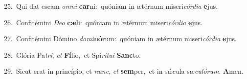 {\numbfont\textcolor{\numbcolor}{25.}}~Qui dat escam \textit{om}\-\textit{ni} \textbf{car}\-ni:~\star quóniam in ætérnum miseri\-\textit{cór}\-\textit{di}\textit{a} \textbf{e}\-jus.\par
{\numbfont\textcolor{\numbcolor}{26.}}~Confitémini \textit{De}\-\textit{o} \textbf{cæ}\-li:~\star quóniam in ætérnum miseri\-\textit{cór}\-\textit{di}\textit{a} \textbf{e}\-jus.\par
{\numbfont\textcolor{\numbcolor}{27.}}~Confitémini Dómino \textit{do}\-\textit{mi}\textbf{nó}rum:~\star quóniam in ætérnum miseri\-\textit{cór}\-\textit{di}\textit{a} \textbf{e}\-jus.\par
{\numbfont\textcolor{\numbcolor}{28.}}~Glória Pa\-\textit{tri}\-, \textit{et} \textbf{Fí}\-lio,~\star et Spi\-\textit{rí}\-\textit{tu}\textit{i} \textbf{Sanc}\-to.\par
{\numbfont\textcolor{\numbcolor}{29.}}~Sicut erat in princípio, et \textit{nunc}\-, \textit{et} \textbf{sem}\-per,~\star et in sǽcula sæ\-\textit{cu}\-\textit{ló}\textit{rum}. \textbf{A}\-men.\par
